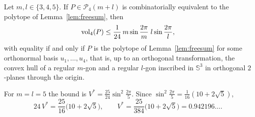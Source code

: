 \begin{corollary}
  \label{cor:pair}
  Let $m, l \in \{3, 4, 5\}$. If $P \in \mathcal{P}_{4}(m+l)$ is
  combinatorially equivalent to the polytope of Lemma~\ref{lem:freesum}, then
  \[
    \operatorname{vol}_{4}(P) \leq \frac{1}{24}\, m\sin\frac{2\pi}{m}\; l\sin\frac{2\pi}{l},
  \]
  with equality if and only if $P$ is the polytope of Lemma~\ref{lem:freesum}
  for some orthonormal basis $u_{1}, \ldots, u_{4}$, that is, up to an
  orthogonal transformation, the convex hull of a regular $m$-gon and a
  regular $l$-gon inscribed in $\mathbb{S}^{3}$ in orthogonal $2$-planes
  through the origin.
\end{corollary}

For $m = l = 5$ the bound is $V^{*} = \frac{25}{24}\sin^{2}\frac{2\pi}{5}$.
Since $\sin^{2}\frac{2\pi}{5} = \frac{1}{16}(10 + 2\sqrt{5})$,
\begin{equation}
  \label{eq:vstar}
  24\,V^{*} = \frac{25}{16}\bigl(10 + 2\sqrt{5}\bigr), \qquad
  V^{*} = \frac{25}{384}\bigl(10 + 2\sqrt{5}\bigr) = 0.942196\ldots.
\end{equation}
